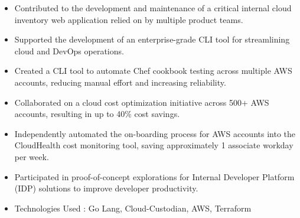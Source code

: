 \begin{itemize}
    \item Contributed to the development and maintenance of a critical internal cloud inventory web application relied on by multiple product teams.
    \item Supported the development of an enterprise-grade CLI tool for streamlining cloud and DevOps operations.
    \item Created a CLI tool to automate Chef cookbook testing across multiple AWS accounts, reducing manual effort and increasing reliability.
    \item Collaborated on a cloud cost optimization initiative across 500+ AWS accounts, resulting in up to 40\% cost savings.
    \item Independently automated the on-boarding process for AWS accounts into the CloudHealth cost monitoring tool, saving approximately 1 associate workday per week.
    \item Participated in proof-of-concept explorations for Internal Developer Platform (IDP) solutions to improve developer productivity.
    \item Technologies Used : Go Lang, Cloud-Custodian, AWS, Terraform
\end{itemize}
